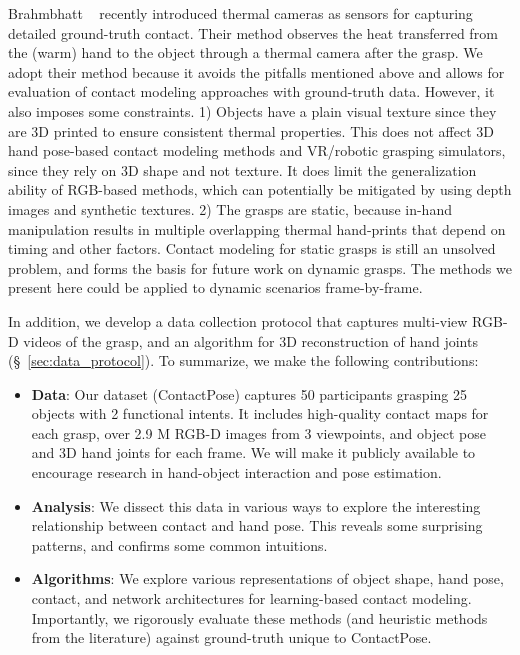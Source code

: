 \documentclass[runningheads]{llncs}
\begin{document}
Brahmbhatt \etal~\cite{contactdbv1} recently introduced thermal cameras as sensors for capturing detailed ground-truth contact. Their method observes the heat transferred from the (warm) hand to the object through a thermal camera after the grasp. We adopt their method because it avoids the pitfalls mentioned above and allows for evaluation of contact modeling approaches with ground-truth data. However, it also imposes some constraints. 1) Objects have a plain visual texture since they are 3D printed to ensure consistent thermal properties. This does not affect 3D hand pose-based contact modeling methods and VR/robotic grasping simulators, since they rely on 3D shape and not texture. It does limit the generalization ability of RGB-based methods, which can potentially be mitigated by using depth images and synthetic textures. 2) The grasps are static, because in-hand manipulation results in multiple overlapping thermal hand-prints that depend on timing and other factors. Contact modeling for static grasps is still an unsolved problem, and forms the basis for future work on dynamic grasps. The methods we present here could be applied to dynamic scenarios frame-by-frame.

In addition, we develop a data collection protocol that captures multi-view RGB-D videos of the grasp, and an algorithm for 3D reconstruction of hand joints (\S~\ref{sec:data_protocol}). To summarize, we make the following contributions:
\begin{itemize}[noitemsep]
    \item \textbf{Data}: Our dataset (ContactPose) captures 50 participants grasping 25 objects with 2 functional intents. It includes high-quality contact maps for each grasp, over 2.9 M RGB-D images from 3 viewpoints, and object pose and 3D hand joints for each frame. We will make it publicly available to encourage research in hand-object interaction and pose estimation.
    \item \textbf{Analysis}: We dissect this data in various ways to explore the interesting relationship between contact and hand pose. This reveals some surprising patterns, and confirms some common intuitions.
    \item \textbf{Algorithms}: We explore various representations of object shape, hand pose, contact, and network architectures for learning-based contact modeling. Importantly, we rigorously evaluate these methods (and heuristic methods from the literature) against ground-truth unique to ContactPose.
\end{itemize}
\end{document}
